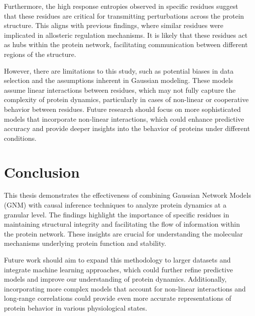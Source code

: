 \documentclass{report}  %
\begin{document}
Furthermore, the high response entropies observed in specific residues suggest that these residues are critical for transmitting perturbations across the protein structure. This aligns with previous findings, where similar residues were implicated in allosteric regulation mechanisms. It is likely that these residues act as hubs within the protein network, facilitating communication between different regions of the structure.

However, there are limitations to this study, such as potential biases in data selection and the assumptions inherent in Gaussian modeling. These models assume linear interactions between residues, which may not fully capture the complexity of protein dynamics, particularly in cases of non-linear or cooperative behavior between residues. Future research should focus on more sophisticated models that incorporate non-linear interactions, which could enhance predictive accuracy and provide deeper insights into the behavior of proteins under different conditions.

\chapter{Conclusion}

This thesis demonstrates the effectiveness of combining Gaussian Network Models (GNM) with causal inference techniques to analyze protein dynamics at a granular level. The findings highlight the importance of specific residues in maintaining structural integrity and facilitating the flow of information within the protein network. These insights are crucial for understanding the molecular mechanisms underlying protein function and stability.

Future work should aim to expand this methodology to larger datasets and integrate machine learning approaches, which could further refine predictive models and improve our understanding of protein dynamics. Additionally, incorporating more complex models that account for non-linear interactions and long-range correlations could provide even more accurate representations of protein behavior in various physiological states.



\end{document}
